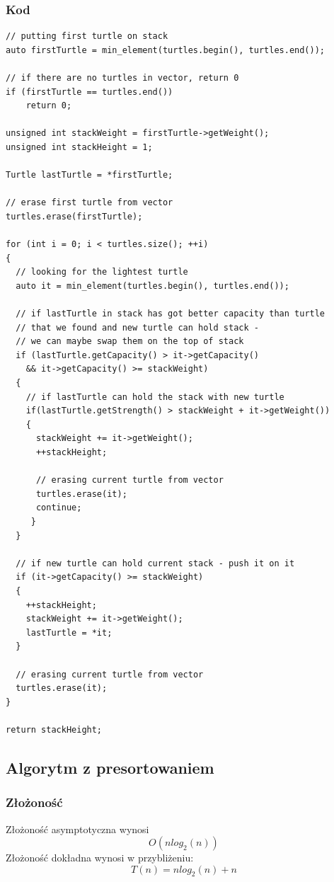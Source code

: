 \documentclass[11pt,a4paper]{article}
\begin{document}
\subsubsection{Kod}
\begin{lstlisting}
// putting first turtle on stack
auto firstTurtle = min_element(turtles.begin(), turtles.end());

// if there are no turtles in vector, return 0	
if (firstTurtle == turtles.end())
	return 0;

unsigned int stackWeight = firstTurtle->getWeight(); 
unsigned int stackHeight = 1;

Turtle lastTurtle = *firstTurtle;

// erase first turtle from vector
turtles.erase(firstTurtle);

for (int i = 0; i < turtles.size(); ++i)
{
  // looking for the lightest turtle
  auto it = min_element(turtles.begin(), turtles.end());
	
  // if lastTurtle in stack has got better capacity than turtle 
  // that we found and new turtle can hold stack - 
  // we can maybe swap them on the top of stack		
  if (lastTurtle.getCapacity() > it->getCapacity() 
    && it->getCapacity() >= stackWeight)						
  {
    // if lastTurtle can hold the stack with new turtle
    if(lastTurtle.getStrength() > stackWeight + it->getWeight())	
    {
      stackWeight += it->getWeight();
      ++stackHeight;
			
      // erasing current turtle from vector
      turtles.erase(it);	
      continue;
     }
  }
	
  // if new turtle can hold current stack - push it on it
  if (it->getCapacity() >= stackWeight)	
  {
    ++stackHeight;
    stackWeight += it->getWeight();
    lastTurtle = *it;
  }
	
  // erasing current turtle from vector
  turtles.erase(it);	
}

return stackHeight;
\end{lstlisting}

\subsection{Algorytm z presortowaniem}
\subsubsection{Złożoność}
Złożoność asymptotyczna wynosi 
\begin{equation}
O(nlog_2(n))
\end{equation}
Złożoność dokładna wynosi w przybliżeniu:
\begin{equation}
T(n)=nlog_2(n)+n
\end{equation}
\end{document}
